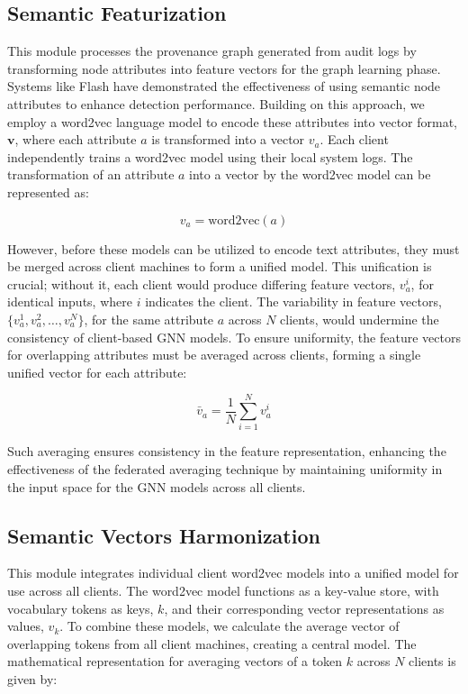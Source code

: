 \subsection{Semantic Featurization}

This module processes the provenance graph generated from audit logs by transforming node attributes into feature vectors for the graph learning phase. Systems like Flash have demonstrated the effectiveness of using semantic node attributes to enhance detection performance. Building on this approach, we employ a word2vec language model to encode these attributes into vector format, \(\mathbf{v}\), where each attribute \(a\) is transformed into a vector \(v_a\). Each client independently trains a word2vec model using their local system logs. The transformation of an attribute \(a\) into a vector by the word2vec model can be represented as:

\[
v_a = \text{word2vec}(a)
\]

However, before these models can be utilized to encode text attributes, they must be merged across client machines to form a unified model. This unification is crucial; without it, each client would produce differing feature vectors, \(v_a^i\), for identical inputs, where \(i\) indicates the client. The variability in feature vectors, \(\{v_a^1, v_a^2, \ldots, v_a^N\}\), for the same attribute \(a\) across \(N\) clients, would undermine the consistency of client-based GNN models. To ensure uniformity, the feature vectors for overlapping attributes must be averaged across clients, forming a single unified vector for each attribute:

\[
\bar{v}_a = \frac{1}{N} \sum_{i=1}^{N} v_a^i
\]

Such averaging ensures consistency in the feature representation, enhancing the effectiveness of the federated averaging technique by maintaining uniformity in the input space for the GNN models across all clients.


\subsection{Semantic Vectors Harmonization}
This module integrates individual client word2vec models into a unified model for use across all clients. The word2vec model functions as a key-value store, with vocabulary tokens as keys, \(k\), and their corresponding vector representations as values, \(v_k\). To combine these models, we calculate the average vector of overlapping tokens from all client machines, creating a central model. The mathematical representation for averaging vectors of a token \(k\) across \(N\) clients is given by:

